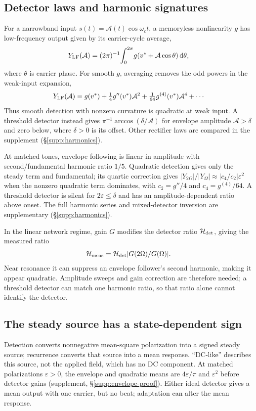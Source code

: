 \documentclass[a4paper]{article}
\newif\ifjne
\begin{document}
\subsection{Detector laws and harmonic signatures}\label{sec:transduction}
For a narrowband input $s(t)=\mathcal A(t)\cos\omega_c t$, a memoryless
nonlinearity $g$ has low-frequency output given by its carrier-cycle average,
\[
Y_{\rm LF}(\mathcal A)=(2\pi)^{-1}\!\int_0^{2\pi}\!g(v^*+\mathcal A\cos\theta)\,\mathrm{d}\theta,
\]
where $\theta$ is carrier phase. For smooth $g$, averaging removes the odd powers
in the weak-input expansion,
\begin{equation}
Y_{\rm LF}(\mathcal A)=g(v^*)+\tfrac14 g''(v^*)\mathcal A^2+\tfrac1{64}g^{(4)}(v^*)\mathcal A^4+\cdots
\label{eq:cycavg}
\end{equation}
Thus smooth detection with nonzero curvature is quadratic at weak input.
A threshold detector instead gives
$\pi^{-1}\arccos(\delta/\mathcal A)$ for envelope amplitude
$\mathcal A>\delta$ and zero below, where $\delta>0$ is its offset.
Other rectifier laws are compared in the supplement (\S\ref{supp:harmonics}).

At matched tones, envelope following is linear in amplitude with
second/fundamental harmonic ratio $1/5$. Quadratic detection gives only
the steady term and fundamental; its quartic correction gives
$|Y_{2\Omega}|/|Y_\Omega|\approx|c_4/c_2|\varepsilon^2$ when the nonzero
quadratic term dominates, with $c_2=g''/4$ and $c_4=g^{(4)}/64$.
A threshold detector is silent for
$2\varepsilon\le\delta$ and has an amplitude-dependent ratio above onset.
The full harmonic series and mixed-detector inversion are supplementary
(\S\ref{supp:harmonics}).
\ifjne\else

\fi

In the linear network regime, gain $G$ modifies the detector ratio
$\mathcal H_{\rm det}$, giving the measured ratio
\[
\mathcal H_{\rm meas}=\mathcal H_{\rm det}|G(2\Omega)/G(\Omega)|.
\]
Near resonance it can suppress an envelope follower's second harmonic,
making it appear quadratic. Amplitude sweeps and gain correction are
therefore needed; a threshold detector can match one harmonic ratio, so that
ratio alone cannot identify the detector.

\subsection{The steady source has a state-dependent sign}\label{sec:dc}
Detection converts nonnegative mean-square polarization into a signed steady
source; recurrence converts that source into a mean response. ``DC-like''
describes this source, not the applied field, which has no DC component.
At matched polarizations $\varepsilon>0$,
the envelope and quadratic means are $4\varepsilon/\pi$ and
$\varepsilon^2$ before detector gains (supplement, \S\ref{supp:envelope-proof}). Either ideal detector gives a mean
output with one carrier, but no beat; adaptation can alter the mean response.
\end{document}
